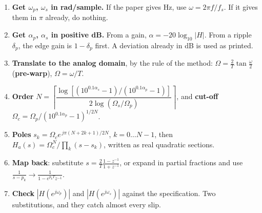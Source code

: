 \begin{enumerate}
  \item \textbf{Get $\omega_p$, $\omega_s$ in rad/sample.} If the paper gives Hz, use
        $\omega=2\pi f/f_s$. If it gives them in $\pi$ already, do nothing.
  \item \textbf{Get $\alpha_p$, $\alpha_s$ in positive dB.} From a gain,
        $\alpha=-20\log_{10}|H|$. From a ripple $\delta_p$, the edge gain is
        $1-\delta_p$ first. A deviation already in dB is used as printed.
  \item \textbf{Translate to the analog domain}, by the rule of the method:
         $\Omega=\frac{2}{T}\tan\frac{\omega}{2}$ (\textbf{pre-warp}),
         $\Omega=\omega/T$.
  \item \textbf{Order}
        $N=\left\lceil\dfrac{\log\left[(10^{0.1\alpha_s}-1)/(10^{0.1\alpha_p}-1)\right]}
        {2\log(\Omega_s/\Omega_p)}\right\rceil$, and
        \textbf{cut-off} $\Omega_c=\Omega_p/(10^{0.1\alpha_p}-1)^{1/2N}$.
  \item \textbf{Poles} $s_k=\Omega_c e^{\,j\pi(N+2k+1)/2N}$, $k=0\dots N-1$, then
        $H_a(s)=\Omega_c^N\big/\prod_k(s-s_k)$, written as real quadratic sections.
  \item \textbf{Map back}: substitute $s=\frac{2}{T}\frac{1-z^{-1}}{1+z^{-1}}$, or
        expand in partial fractions and use
        $\frac{1}{s-p_k}\to\frac{1}{1-e^{p_kT}z^{-1}}$.
  \item \textbf{Check} $|H(e^{j\omega_p})|$ and $|H(e^{j\omega_s})|$ against the
        specification. Two substitutions, and they catch almost every slip.
\end{enumerate}

